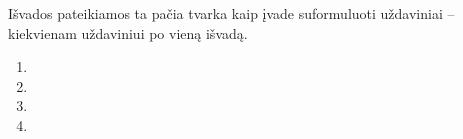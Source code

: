 Išvados pateikiamos ta pačia tvarka kaip įvade suformuluoti uždaviniai -- kiekvienam uždaviniui po vieną išvadą.

\begin{enumerate}
    \item \lipsum[1][1-3]
    \item \lipsum[2][1-3]
    \item \lipsum[3][1-3]
    \item \lipsum[4][1-3]
\end{enumerate}
